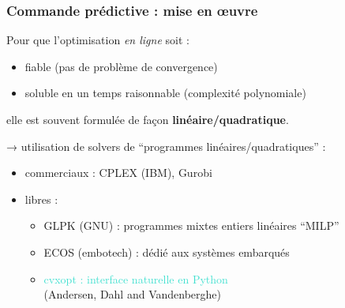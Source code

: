 \begin{frame}
  \frametitle{Commande prédictive : mise en œuvre}
  
  Pour que l'optimisation \emph{en ligne} soit :
  \begin{itemize}
   \item fiable (pas de problème de convergence)
   \item soluble en un temps raisonnable (complexité polynomiale)
  \end{itemize}
  elle est souvent formulée de façon \textbf{linéaire/quadratique}.
  
  
  \bigskip \pause
  → utilisation de solvers de ``programmes linéaires/quadratiques'' :
  
  \begin{itemize}
   \item commerciaux : CPLEX (IBM), Gurobi
   \item libres : 
   \begin{itemize}
    \item GLPK (GNU) : programmes mixtes entiers linéaires ``MILP''
    \item ECOS (embotech) : dédié aux systèmes embarqués
    \item \textcolor{turquoise}{cvxopt : interface naturelle en Python} \\ { \footnotesize (Andersen, Dahl and Vandenberghe)}
   \end{itemize}
  \end{itemize}
\end{frame}

